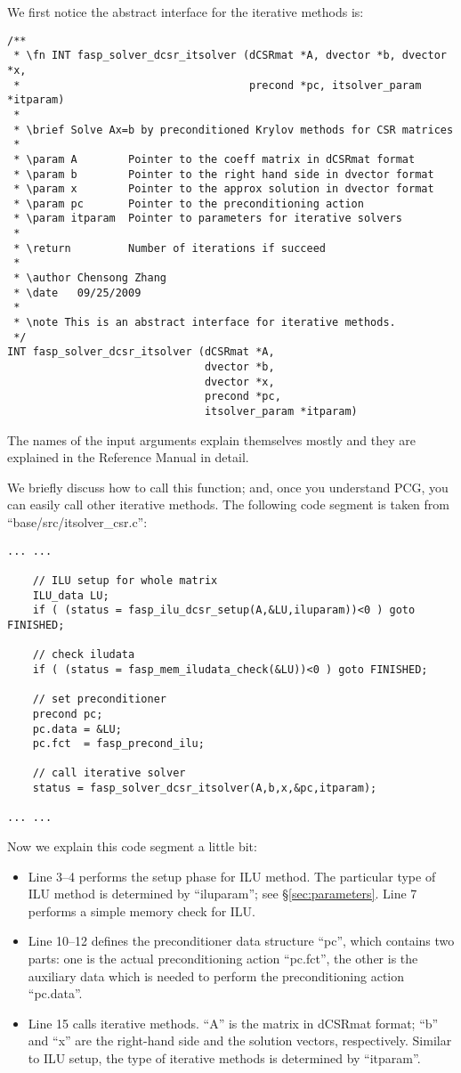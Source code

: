 \documentclass[11pt]{memoir}
\begin{document}
We first notice the abstract interface for the iterative methods is:
%
\begin{lstlisting}[numbers=none]
/**
 * \fn INT fasp_solver_dcsr_itsolver (dCSRmat *A, dvector *b, dvector *x, 
 *                                    precond *pc, itsolver_param *itparam)
 *
 * \brief Solve Ax=b by preconditioned Krylov methods for CSR matrices
 *
 * \param A        Pointer to the coeff matrix in dCSRmat format
 * \param b        Pointer to the right hand side in dvector format
 * \param x        Pointer to the approx solution in dvector format
 * \param pc       Pointer to the preconditioning action
 * \param itparam  Pointer to parameters for iterative solvers
 *
 * \return         Number of iterations if succeed
 *
 * \author Chensong Zhang
 * \date   09/25/2009 
 *
 * \note This is an abstract interface for iterative methods.
 */
INT fasp_solver_dcsr_itsolver (dCSRmat *A, 
                               dvector *b, 
                               dvector *x, 
                               precond *pc, 
                               itsolver_param *itparam)
\end{lstlisting}
%
The names of the input arguments explain themselves mostly and they are explained in the Reference Manual in detail. 

We briefly discuss how to call this function; and, once you understand PCG, you can easily call other iterative methods. The following code segment is taken from ``base/src/itsolver\_csr.c'':
%
\begin{lstlisting}
... ...

    // ILU setup for whole matrix
    ILU_data LU; 
    if ( (status = fasp_ilu_dcsr_setup(A,&LU,iluparam))<0 ) goto FINISHED;
    
    // check iludata
    if ( (status = fasp_mem_iludata_check(&LU))<0 ) goto FINISHED;
    
    // set preconditioner 
    precond pc; 
    pc.data = &LU; 
    pc.fct  = fasp_precond_ilu;
    
    // call iterative solver
    status = fasp_solver_dcsr_itsolver(A,b,x,&pc,itparam);
    
... ...
\end{lstlisting}
%
Now we explain this code segment a little bit:
\begin{itemize}
\item Line 3--4 performs the setup phase for ILU method. The particular type of ILU method is determined by ``iluparam''; see \S\ref{sec:parameters}. Line 7 performs a simple memory check for ILU.
\item Line 10--12 defines the preconditioner data structure ``pc'', which contains two parts: one is the actual preconditioning action ``pc.fct'', the other is the auxiliary data which is needed to perform the preconditioning action ``pc.data''.
\item Line 15 calls iterative methods. ``A'' is the matrix in dCSRmat format; ``b'' and ``x'' are the right-hand side and the solution vectors, respectively. Similar to ILU setup, the type of iterative methods is determined by ``itparam''. 
\end{itemize}
\end{document}
